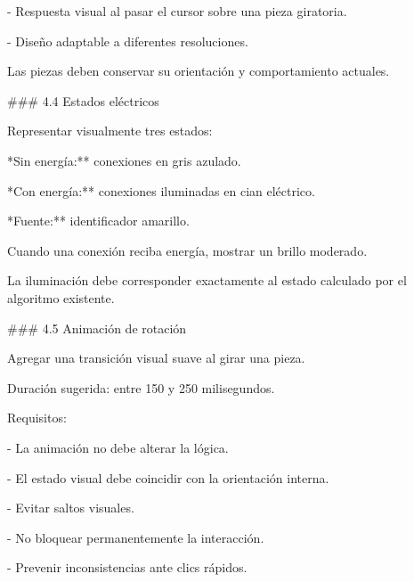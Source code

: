 \noindent - Respuesta visual al pasar el cursor sobre una pieza giratoria.\par
\noindent - Diseño adaptable a diferentes resoluciones.\par
\par\smallskip
\noindent Las piezas deben conservar su orientación y comportamiento actuales.\par
\par\smallskip
\noindent \#\#\# 4.4 Estados eléctricos\par
\par\smallskip
\noindent Representar visualmente tres estados:\par
\par\smallskip
\noindent **Sin energía:** conexiones en gris azulado.\par
\par\smallskip
\noindent **Con energía:** conexiones iluminadas en cian eléctrico.\par
\par\smallskip
\noindent **Fuente:** identificador amarillo.\par
\par\smallskip
\noindent Cuando una conexión reciba energía, mostrar un brillo moderado.\par
\par\smallskip
\noindent La iluminación debe corresponder exactamente al estado calculado por el algoritmo existente.\par
\par\smallskip
\noindent \#\#\# 4.5 Animación de rotación\par
\par\smallskip
\noindent Agregar una transición visual suave al girar una pieza.\par
\par\smallskip
\noindent Duración sugerida: entre 150 y 250 milisegundos.\par
\par\smallskip
\noindent Requisitos:\par
\par\smallskip
\noindent - La animación no debe alterar la lógica.\par
\noindent - El estado visual debe coincidir con la orientación interna.\par
\noindent - Evitar saltos visuales.\par
\noindent - No bloquear permanentemente la interacción.\par
\noindent - Prevenir inconsistencias ante clics rápidos.\par
